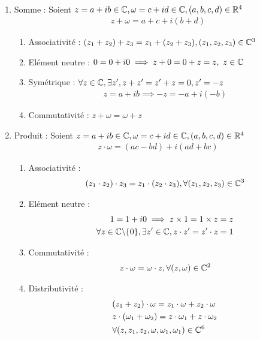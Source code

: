     \begin{proposition}~
\begin{enumerate}
\item Somme : Soient $z = a + ib \in \mathbb{C}, \omega = c + id \in \mathbb{C}, (a, b, c, d) \in \mathbb{R}^4$
\begin{align*}
    z + \omega = a + c + i (b + d)
\end{align*}

\begin{enumerate}
    \item Associativité : $(z_1 + z_2) + z_3 = z_1 + (z_2 + z_3), (z_1, z_2, z_3) \in \mathbb{C}^3$
    \item Elément neutre : $0 = 0 + i0 \implies z + 0 = 0 + z = z,\ z \in \mathbb{C}$
\item Symétrique : $\forall z \in \mathbb{C}, \exists z', z + z' = z' + z = 0, z' = -z$
\begin{align*}
    z = a + ib \implies -z = -a + i(-b)
\end{align*}
\item Commutativité : $z + \omega = \omega + z$
\end{enumerate}

\item Produit : Soient $z = a + ib \in \mathbb{C}, \omega = c + id \in \mathbb{C}, (a, b, c, d) \in \mathbb{R}^4$
\begin{align*}
    z \cdot \omega = (ac - bd) + i(ad + bc)
\end{align*}

\begin{enumerate}
    \item Associativité :
    \begin{align*}
        (z_1 \cdot z_2) \cdot z_3 = z_1 \cdot (z_2 \cdot z_3), \forall (z_1, z_2, z_3) \in \mathbb{C}^3 
    \end{align*}
    \item Elément neutre :
        \begin{align*}
            1 = 1 + i0 \implies z \times 1 = 1 \times z = z \\
            \forall z \in \mathbb{C} \backslash \{0\}, \exists z' \in \mathbb{C}, z \cdot z' = z' \cdot z =1 
        \end{align*}
    \item Commutativité :
        \begin{align*}
            z \cdot \omega = \omega \cdot z, \forall (z, \omega) \in \mathbb{C}^2 
        \end{align*}
    \item Distributivité :
        \begin{align*}
        &(z_1 + z_2) \cdot \omega = z_1 \cdot \omega + z_2 \cdot \omega \\
        &z \cdot (\omega_1 + \omega_2) = z \cdot \omega_1 + z \cdot \omega_2 \\
        &\forall (z, z_1, z_2, \omega, \omega_1, \omega_1) \in \mathbb{C}^6
        \end{align*}
\end{enumerate}

\end{enumerate}
\end{proposition}

